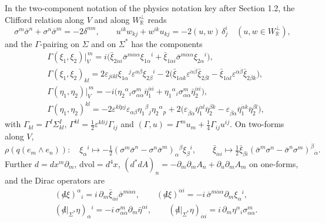 \begin{remark}
In the two-component notation of the physics notation key after Section 1.2, the Clifford relation along $V$ and along $W_{\mathbb R}^\perp$ reads
\[
\sigma^m\bar\sigma^n+\sigma^n\bar\sigma^m=-2\delta^{mn},\qquad u^{ik}w_{kj}+w^{ik}u_{kj}=-2(u,w)\,\delta^i_j\quad(u,w\in W_{\mathbb R}^\perp),
\]
and the $\Gamma$-pairing on $\Sigma$ and on $\Sigma^*$ has the components
\[
\begin{aligned}
&\Gamma(\xi_1,\xi_2)\big|_V^{\,m}=i\big(\bar\xi_{2\dot\alpha i}\bar\sigma^{m\dot\alpha\alpha}\xi_{1\alpha}{}^i+\bar\xi_{1\dot\alpha i}\bar\sigma^{m\dot\alpha\alpha}\xi_{2\alpha}{}^i\big),\\
&\Gamma(\xi_1,\xi_2)_{kl}=2\varepsilon_{jikl}\xi_{1\alpha}{}^j\varepsilon^{\alpha\beta}\xi_{2\beta}{}^i-2\big(\bar\xi_{1\dot\alpha k}\varepsilon^{\dot\alpha\dot\beta}\bar\xi_{2\dot\beta l}-\bar\xi_{1\dot\alpha l}\varepsilon^{\dot\alpha\dot\beta}\bar\xi_{2\dot\beta k}\big),\\
&\Gamma(\eta_1,\eta_2)\big|_V^{\,m}=-i\big(\eta_2{}^\alpha{}_i\sigma^m_{\alpha\dot\alpha}\bar\eta_1^{\dot\alpha i}+\eta_1{}^\alpha{}_i\sigma^m_{\alpha\dot\alpha}\bar\eta_2^{\dot\alpha i}\big),\\
&\Gamma(\eta_1,\eta_2)^{kl}=-2\varepsilon^{klpj}\varepsilon_{\alpha\beta}\eta_1{}^\beta{}_j\eta_2{}^\alpha{}_p+2\big(\varepsilon_{\dot\beta\dot\alpha}\bar\eta_1^{\dot\alpha l}\bar\eta_2^{\dot\beta k}-\varepsilon_{\dot\beta\dot\alpha}\bar\eta_1^{\dot\alpha k}\bar\eta_2^{\dot\beta l}\big),
\end{aligned}
\]
with $\Gamma_{kl}=\Gamma^I\Sigma^I_{kl}$, $\Gamma^{kl}=\tfrac12\varepsilon^{klij}\Gamma_{ij}$ and $(\Gamma,u)=\Gamma^mu_m+\tfrac14\Gamma_{ij}u^{ij}$. On two-forms along $V$,
\[
\rho(q(e_m\wedge e_n))\colon\quad \xi_\alpha{}^i\mapsto-\tfrac12(\sigma^m\bar\sigma^n-\sigma^n\bar\sigma^m)_\alpha{}^\beta\xi_\beta{}^i,\qquad \bar\xi_{\dot\alpha i}\mapsto\tfrac12\bar\xi_{\dot\beta i}(\bar\sigma^m\sigma^n-\bar\sigma^n\sigma^m)^{\dot\beta}{}_{\dot\alpha}.
\]
Further $d=dx^m\partial_m$, $\mathrm{dvol}=d^4x$, $(d^*dA)_n=-\partial_m\partial_mA_n+\partial_n\partial_mA_m$ on one-forms, and the Dirac operators are
\[
\begin{aligned}
&({\not d}\xi)^\alpha{}_i=i\,\partial_m\bar\xi_{\dot\alpha i}\bar\sigma^{m\dot\alpha\alpha},\qquad ({\not d}\xi)^{\dot\alpha i}=-i\,\bar\sigma^{m\dot\alpha\alpha}\partial_m\xi_\alpha{}^i,\\
&({\not d}|_{\Sigma^*}\eta)_\alpha{}^i=-i\,\sigma^m_{\alpha\dot\alpha}\partial_m\bar\eta^{\dot\alpha i},\qquad ({\not d}|_{\Sigma^*}\eta)_{\dot\alpha i}=i\,\partial_m\eta^\alpha{}_i\sigma^m_{\alpha\dot\alpha}.
\end{aligned}
\]
\end{remark}

